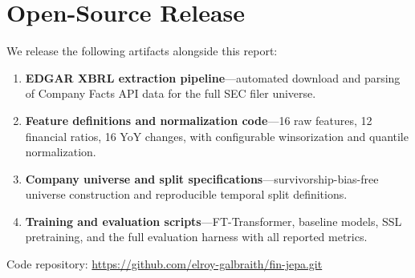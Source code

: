\section{Open-Source Release}
\label{sec:release}

We release the following artifacts alongside this report:

\begin{enumerate}[leftmargin=*]
  \item \textbf{EDGAR XBRL extraction pipeline}---automated download and parsing of Company Facts API data for the full SEC filer universe.
  \item \textbf{Feature definitions and normalization code}---16 raw features, 12 financial ratios, 16 YoY changes, with configurable winsorization and quantile normalization.
  \item \textbf{Company universe and split specifications}---survivorship-bias-free universe construction and reproducible temporal split definitions.
  \item \textbf{Training and evaluation scripts}---FT-Transformer, baseline models, SSL pretraining, and the full evaluation harness with all reported metrics.
\end{enumerate}

Code repository: \url{https://github.com/elroy-galbraith/fin-jepa.git}